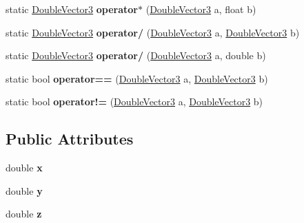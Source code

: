 \begin{DoxyCompactItemize}
\mbox{\label{struct_q9_core_1_1_double_vector3_a04101f7139b00618307bc9bfb98e1836}} 
static \mbox{\hyperlink{struct_q9_core_1_1_double_vector3}{Double\+Vector3}} {\bfseries operator$\ast$} (\mbox{\hyperlink{struct_q9_core_1_1_double_vector3}{Double\+Vector3}} a, float b)
\item 
\mbox{\label{struct_q9_core_1_1_double_vector3_ae89d0b1bd86c0f1714184a2d956d0527}} 
static \mbox{\hyperlink{struct_q9_core_1_1_double_vector3}{Double\+Vector3}} {\bfseries operator/} (\mbox{\hyperlink{struct_q9_core_1_1_double_vector3}{Double\+Vector3}} a, \mbox{\hyperlink{struct_q9_core_1_1_double_vector3}{Double\+Vector3}} b)
\item 
\mbox{\label{struct_q9_core_1_1_double_vector3_a866efd17e6601ed8460ccff1c517c368}} 
static \mbox{\hyperlink{struct_q9_core_1_1_double_vector3}{Double\+Vector3}} {\bfseries operator/} (\mbox{\hyperlink{struct_q9_core_1_1_double_vector3}{Double\+Vector3}} a, double b)
\item 
\mbox{\label{struct_q9_core_1_1_double_vector3_ade8f91ca4bba6717cc6b8413e6a96780}} 
static bool {\bfseries operator==} (\mbox{\hyperlink{struct_q9_core_1_1_double_vector3}{Double\+Vector3}} a, \mbox{\hyperlink{struct_q9_core_1_1_double_vector3}{Double\+Vector3}} b)
\item 
\mbox{\label{struct_q9_core_1_1_double_vector3_afd35ea7e6dedac65442d3a6721d6aaea}} 
static bool {\bfseries operator!=} (\mbox{\hyperlink{struct_q9_core_1_1_double_vector3}{Double\+Vector3}} a, \mbox{\hyperlink{struct_q9_core_1_1_double_vector3}{Double\+Vector3}} b)
\end{DoxyCompactItemize}
\subsection*{Public Attributes}
\begin{DoxyCompactItemize}
\item 
\mbox{\label{struct_q9_core_1_1_double_vector3_a1e662f59f9cb9f4d34461936610b858a}} 
double {\bfseries x}
\item 
\mbox{\label{struct_q9_core_1_1_double_vector3_ab5c442aa61d12fcde967fe7e9066cd23}} 
double {\bfseries y}
\item 
\mbox{\label{struct_q9_core_1_1_double_vector3_a0bf05f37b83b2ed265111d2cd407eff7}} 
double {\bfseries z}
\end{DoxyCompactItemize}
